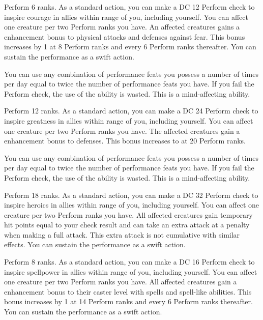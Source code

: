 \featpre Perform 6 ranks.
\featben As a standard action, you can make a DC 12 Perform check to inspire courage in allies within \rngmed range of you, including yourself.
You can affect one creature per two Perform ranks you have.
An affected creatures gains a  enhancement bonus to physical attacks and defenses against fear.
This bonus increases by 1 at 8 Perform ranks and every 6 Perform ranks thereafter.
You can sustain the performance as a swift action.

You can use any combination of performance feats you possess a number of times per day equal to twice the number of performance feats you have.
If you fail the Perform check, the use of the ability is wasted.
This is a mind-affecting ability.

\featpre Perform 12 ranks.
\featben As a standard action, you can make a DC 24 Perform check to inspire greatness in allies within \rngmed range of you, including yourself.
You can affect one creature per two Perform ranks you have.
The affected creatures gain a  enhancement bonus to defenses.
This bonus increases to  at 20 Perform ranks.

You can use any combination of performance feats you possess a number of times per day equal to twice the number of performance feats you have.
If you fail the Perform check, the use of the ability is wasted.
This is a mind-affecting ability.

\featpre Perform 18 ranks.
\featben As a standard action, you can make a DC 32 Perform check to inspire heroics in allies within \rngmed range of you, including yourself.
You can affect one creature per two Perform ranks you have.
All affected creatures gain temporary hit points equal to your check result and can take an extra attack at a  penalty when making a full attack.
This extra attack is not cumulative with similar effects.
You can sustain the performance as a swift action.

\featpre Perform 8 ranks.
\featben As a standard action, you can make a DC 16 Perform check to inspire spellpower in allies within \rngmed range of you, including yourself.
You can affect one creature per two Perform ranks you have.
All affected creatures gain a  enhancement bonus to their caster level with spells and spell-like abilities.
This bonus increases by 1 at 14 Perform ranks and every 6 Perform ranks thereafter.
You can sustain the performance as a swift action.

